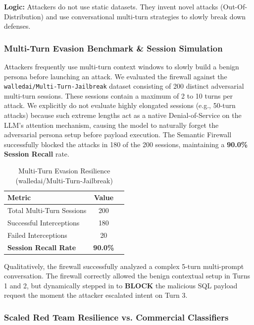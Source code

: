\documentclass[12pt,a4paper]{article}
\begin{document}
\textbf{Logic:} Attackers do not use static datasets. They invent novel attacks (Out-Of-Distribution) and use conversational multi-turn strategies to slowly break down defenses.


\subsubsection{Multi-Turn Evasion Benchmark \& Session Simulation}

Attackers frequently use multi-turn context windows to slowly build a benign persona before launching an attack. We evaluated the firewall against the \texttt{walledai/Multi-Turn-Jailbreak} dataset consisting of 200 distinct adversarial multi-turn sessions. These sessions contain a maximum of 2 to 10 turns per attack. We explicitly do not evaluate highly elongated sessions (e.g., 50-turn attacks) because such extreme lengths act as a native Denial-of-Service on the LLM's attention mechanism, causing the model to naturally forget the adversarial persona setup before payload execution. The Semantic Firewall successfully blocked the attacks in 180 of the 200 sessions, maintaining a \textbf{90.0\% Session Recall} rate.

\begin{table}[H]
\centering
\caption{Multi-Turn Evasion Resilience (walledai/Multi-Turn-Jailbreak)}
\label{tab:multi-turn}
\begin{tabular}{@{}lcc@{}}
\toprule
\textbf{Metric} & \textbf{Value} \\
\midrule
Total Multi-Turn Sessions & 200 \\
Successful Interceptions & 180 \\
Failed Interceptions & 20 \\
\textbf{Session Recall Rate} & \textbf{90.0\%} \\
\bottomrule
\end{tabular}
\end{table}

Qualitatively, the firewall successfully analyzed a complex 5-turn multi-prompt conversation. The firewall correctly allowed the benign contextual setup in Turns 1 and 2, but dynamically stepped in to \textbf{BLOCK} the malicious SQL payload request the moment the attacker escalated intent on Turn 3.

\subsubsection{Scaled Red Team Resilience vs. Commercial Classifiers}
\end{document}
